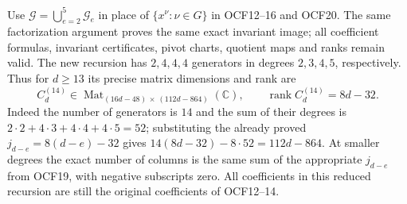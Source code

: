 Use $\mathcal G=\bigcup_{e=2}^5\mathcal G_e$ in place of
$\{x^\nu:\nu\in G\}$ in OCF12--16 and OCF20. The same
factorization argument proves the same exact invariant image;
all coefficient formulas, invariant certificates, pivot charts,
quotient maps and ranks remain valid. The new recursion has
$2,4,4,4$ generators in degrees $2,3,4,5$, respectively. Thus
for $d\geq13$ its precise matrix dimensions and rank are
\[
 C_d^{(14)}\in
 \operatorname{Mat}_{(16d-48)\,\times\,(112d-864)}(\mathbb C),
 \qquad \operatorname{rank}C_d^{(14)}=8d-32.
 \tag{OCF26}
\]
Indeed the number of generators is $14$ and the sum of their
degrees is $2\cdot2+4\cdot3+4\cdot4+4\cdot5=52$; substituting
the already proved $j_{d-e}=8(d-e)-32$ gives
$14(8d-32)-8\cdot52=112d-864$. At smaller degrees the exact
number of columns is the same sum of the appropriate $j_{d-e}$
from OCF19, with negative subscripts zero. All coefficients
in this reduced recursion are still the original coefficients
of OCF12--14.
